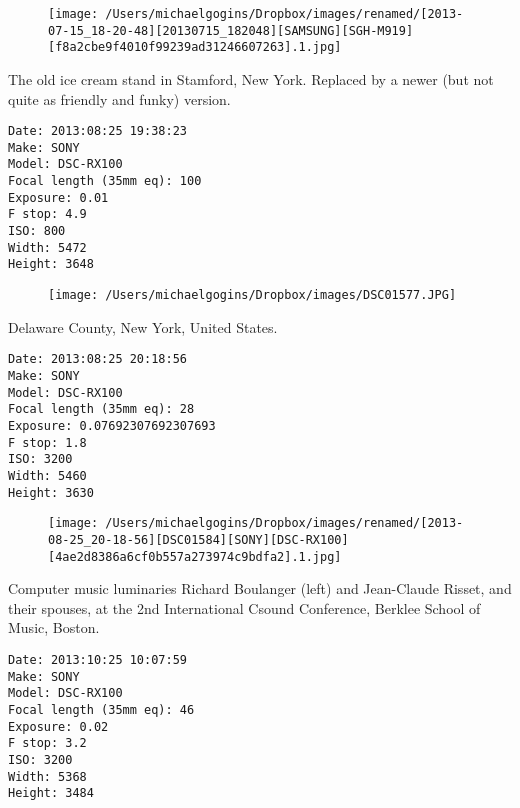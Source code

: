 \documentclass[11pt,letter,DIV=14,paper=landscape]{scrbook}
\begin{document}
\begin{figure}
\texttt{[image: /Users/michaelgogins/Dropbox/images/renamed/[2013-07-15\_18-20-48][20130715\_182048][SAMSUNG][SGH-M919][f8a2cbe9f4010f99239ad31246607263].1.jpg]}
\end{figure}
    
\clearpage
\noindent The old ice cream stand in Stamford, New York. Replaced by a newer (but not quite as friendly and funky) version.
\noindent
\begin{lstlisting}
Date: 2013:08:25 19:38:23
Make: SONY
Model: DSC-RX100
Focal length (35mm eq): 100
Exposure: 0.01
F stop: 4.9
ISO: 800
Width: 5472
Height: 3648
\end{lstlisting}
\clearpage

\begin{figure}
\texttt{[image: /Users/michaelgogins/Dropbox/images/DSC01577.JPG]}
\end{figure}
    
\clearpage
\noindent Delaware County, New York, United States.
\noindent
\begin{lstlisting}
Date: 2013:08:25 20:18:56
Make: SONY
Model: DSC-RX100
Focal length (35mm eq): 28
Exposure: 0.07692307692307693
F stop: 1.8
ISO: 3200
Width: 5460
Height: 3630
\end{lstlisting}
\clearpage

\begin{figure}
\texttt{[image: /Users/michaelgogins/Dropbox/images/renamed/[2013-08-25\_20-18-56][DSC01584][SONY][DSC-RX100][4ae2d8386a6cf0b557a273974c9bdfa2].1.jpg]}
\end{figure}
    
\clearpage
\noindent Computer music luminaries Richard Boulanger (left) and Jean-Claude Risset, and their spouses, at the 2nd International Csound Conference, Berklee School of Music, Boston.
\noindent
\begin{lstlisting}
Date: 2013:10:25 10:07:59
Make: SONY
Model: DSC-RX100
Focal length (35mm eq): 46
Exposure: 0.02
F stop: 3.2
ISO: 3200
Width: 5368
Height: 3484
\end{lstlisting}
\clearpage
\end{document}
